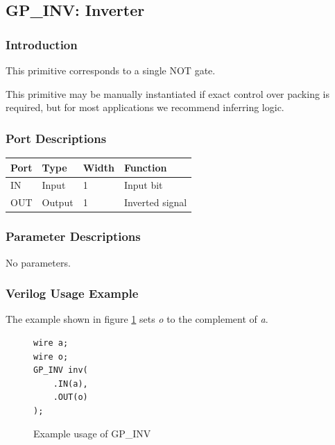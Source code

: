 \documentclass[11pt]{article}
\begin{document}

\pagebreak
\subsection{GP\_INV: Inverter}

\subsubsection{Introduction}
This primitive corresponds to a single NOT gate.

This primitive may be manually instantiated if exact control over packing is required, but for most applications we 
recommend inferring logic.

\subsubsection{Port Descriptions}

\begin{tabularx}{4in}{|l|l|l|X|}
\hline
{\bfseries Port} & {\bfseries Type} & {\bfseries Width} & {\bfseries Function} \\
\hline
IN & Input & 1 & Input bit \\
\hline
OUT & Output & 1 & Inverted signal \\
\hline
\end{tabularx}

\subsubsection{Parameter Descriptions}

No parameters.

\subsubsection{Verilog Usage Example}

The example shown in figure \ref{gp-inv-example} sets \emph{o} to the complement of \emph{a}.

\begin{figure}[h]
\begin{lstlisting}
wire a;
wire o;
GP_INV inv(
	.IN(a),
	.OUT(o)
);
\end{lstlisting}
\caption{Example usage of GP\_INV}
\label{gp-inv-example}
\end{figure}
\end{document}

